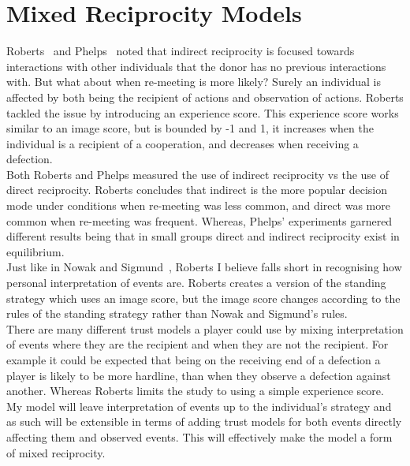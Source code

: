 \documentclass[]{final_report}
\begin{document}
\section{Mixed Reciprocity Models}
Roberts~\cite{evoldirindir} and Phelps~\cite{phelps_game_theoretic_analysis} noted that indirect reciprocity is focused towards interactions with other individuals that the donor has no previous interactions with. But what about when re-meeting is more likely? Surely an individual is affected by both being the recipient of actions and observation of actions. Roberts tackled the issue by introducing an experience score. This experience score works similar to an image score, but is bounded by -1 and 1, it increases when the individual is a recipient of a cooperation, and decreases when receiving a defection.\\
Both Roberts and Phelps measured the use of indirect reciprocity vs the use of direct reciprocity. Roberts concludes that indirect is the more popular decision mode under conditions when re-meeting was less common, and direct was more common when re-meeting was frequent. Whereas, Phelps' experiments garnered different results being that in small groups direct and indirect reciprocity exist in equilibrium.\\
Just like in Nowak and Sigmund~\cite{evol_indirect_image}, Roberts I believe falls short in recognising how personal interpretation of events are. Roberts creates a version of the standing strategy which uses an image score, but the image score changes according to the rules of the standing strategy rather than Nowak and Sigmund's rules.\\
There are many different trust models a player could use by mixing interpretation of events where they are the recipient and when they are not the recipient. For example it could be expected that being on the receiving end of a defection a player is likely to be more hardline, than when they observe a defection against another. Whereas Roberts limits the study to using a simple experience score.\\
My model will leave interpretation of events up to the individual's strategy and as such will be extensible in terms of adding trust models for both events directly affecting them and observed events. This will effectively make the model a form of mixed reciprocity.
\end{document}
